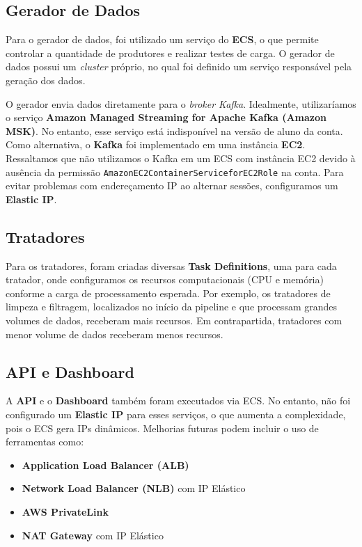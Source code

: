 \documentclass[a4paper,12pt]{article}
\begin{document}
\subsection{Gerador de Dados}

Para o gerador de dados, foi utilizado um serviço do \textbf{ECS}, o que permite controlar a quantidade de produtores e realizar testes de carga. O gerador de dados possui um \textit{cluster} próprio, no qual foi definido um serviço responsável pela geração dos dados.

O gerador envia dados diretamente para o \textit{broker Kafka}. Idealmente, utilizaríamos o serviço \textbf{Amazon Managed Streaming for Apache Kafka (Amazon MSK)}. No entanto, esse serviço está indisponível na versão de aluno da conta. Como alternativa, o \textbf{Kafka} foi implementado em uma instância \textbf{EC2}. Ressaltamos que não utilizamos o Kafka em um ECS com instância EC2 devido à ausência da permissão \texttt{AmazonEC2ContainerServiceforEC2Role} na conta. Para evitar problemas com endereçamento IP ao alternar sessões, configuramos um \textbf{Elastic IP}.

\subsection{Tratadores}

Para os tratadores, foram criadas diversas \textbf{Task Definitions}, uma para cada tratador, onde configuramos os recursos computacionais (CPU e memória) conforme a carga de processamento esperada. Por exemplo, os tratadores de limpeza e filtragem, localizados no início da pipeline e que processam grandes volumes de dados, receberam mais recursos. Em contrapartida, tratadores com menor volume de dados receberam menos recursos.

\subsection{API e Dashboard}

A \textbf{API} e o \textbf{Dashboard} também foram executados via ECS. No entanto, não foi configurado um \textbf{Elastic IP} para esses serviços, o que aumenta a complexidade, pois o ECS gera IPs dinâmicos. Melhorias futuras podem incluir o uso de ferramentas como:

\begin{itemize}
    \item \textbf{Application Load Balancer (ALB)}
    \item \textbf{Network Load Balancer (NLB)} com IP Elástico
    \item \textbf{AWS PrivateLink}
    \item \textbf{NAT Gateway} com IP Elástico
\end{itemize}
\end{document}
